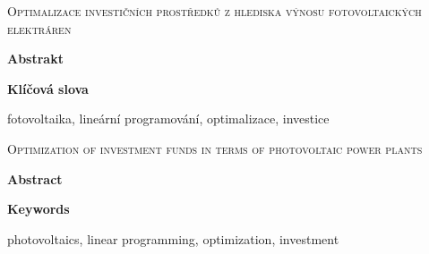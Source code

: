 \thispagestyle{empty}

\textsc{Optimalizace investičních prostředků z hlediska výnosu fotovoltaických elektráren}

\vspace{0.5cm}

\textbf{Abstrakt}

\textbf{Klíčová slova}

fotovoltaika, lineární programování, optimalizace, investice

\vspace{0.7cm}

\textsc{Optimization of investment funds in terms of photovoltaic power plants}

\textbf{Abstract}

\textbf{Keywords}

photovoltaics, linear programming, optimization, investment

\newpage
